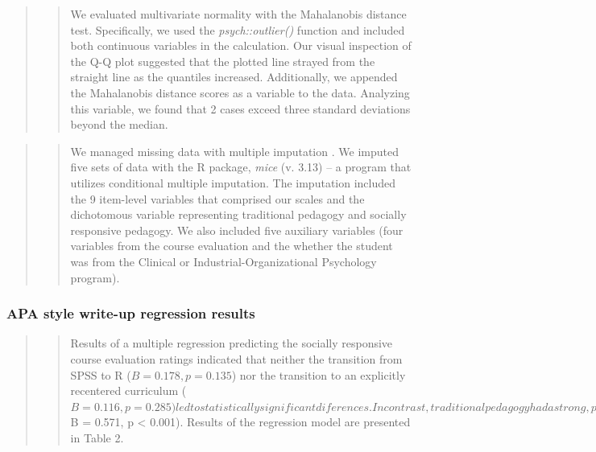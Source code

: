 \documentclass[
  11pt,
]{book}
\begin{document}
\begin{quote}
\begin{quote}
We evaluated multivariate normality with the Mahalanobis distance test. Specifically, we used the \emph{psych::outlier()} function and included both continuous variables in the calculation. Our visual inspection of the Q-Q plot suggested that the plotted line strayed from the straight line as the quantiles increased. Additionally, we appended the Mahalanobis distance scores as a variable to the data. Analyzing this variable, we found that 2 cases exceed three standard deviations beyond the median.
\end{quote}
\end{quote}

\begin{quote}
\begin{quote}
We managed missing data with multiple imputation \citep{enders_multiple_2017, katitas_getting_2019}. We imputed five sets of data with the R package, \emph{mice} (v. 3.13) -- a program that utilizes conditional multiple imputation. The imputation included the 9 item-level variables that comprised our scales and the dichotomous variable representing traditional pedagogy and socially responsive pedagogy. We also included five auxiliary variables (four variables from the course evaluation and the whether the student was from the Clinical or Industrial-Organizational Psychology program).
\end{quote}
\end{quote}

\hypertarget{apa-style-write-up-regression-results}{%
\subsubsection{APA style write-up regression results}\label{apa-style-write-up-regression-results}}

\begin{quote}
\begin{quote}
Results of a multiple regression predicting the socially responsive course evaluation ratings indicated that neither the transition from SPSS to R (\(B = 0.178, p = 0.135\)) nor the transition to an explicitly recentered curriculum (\(B = 0.116, p = 0.285) led to statistically significant diferences. In contrast, traditional pedagogy had a strong, positive effect on evaluations of socially responsive pedagogy (\)B = 0.571, p \textless{} 0.001). Results of the regression model are presented in Table 2.
\end{quote}
\end{quote}
\end{document}

